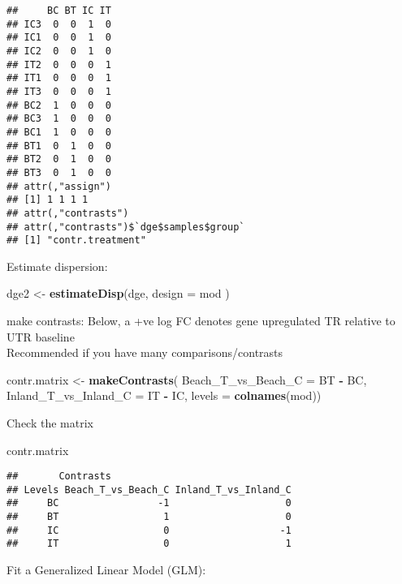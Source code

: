 \documentclass[
]{article}
\newenvironment{Shaded}{\begin{snugshade}}{\end{snugshade}}
\newcommand{\DataTypeTok}[1]{\textcolor[rgb]{0.13,0.29,0.53}{#1}}
\newcommand{\KeywordTok}[1]{\textcolor[rgb]{0.13,0.29,0.53}{\textbf{#1}}}
\newcommand{\NormalTok}[1]{#1}
\newcommand{\OperatorTok}[1]{\textcolor[rgb]{0.81,0.36,0.00}{\textbf{#1}}}
\newcommand{\StringTok}[1]{\textcolor[rgb]{0.31,0.60,0.02}{#1}}
\begin{document}
\begin{verbatim}
##     BC BT IC IT
## IC3  0  0  1  0
## IC1  0  0  1  0
## IC2  0  0  1  0
## IT2  0  0  0  1
## IT1  0  0  0  1
## IT3  0  0  0  1
## BC2  1  0  0  0
## BC3  1  0  0  0
## BC1  1  0  0  0
## BT1  0  1  0  0
## BT2  0  1  0  0
## BT3  0  1  0  0
## attr(,"assign")
## [1] 1 1 1 1
## attr(,"contrasts")
## attr(,"contrasts")$`dge$samples$group`
## [1] "contr.treatment"
\end{verbatim}

Estimate dispersion:

\begin{Shaded}
\begin{Highlighting}[]
\NormalTok{dge2 <-}\StringTok{ }\KeywordTok{estimateDisp}\NormalTok{(dge, }\DataTypeTok{design =}\NormalTok{ mod )}
\end{Highlighting}
\end{Shaded}

make contrasts: Below, a +ve log FC denotes gene upregulated TR relative
to UTR baseline\\
Recommended if you have many comparisons/contrasts

\begin{Shaded}
\begin{Highlighting}[]
\NormalTok{contr.matrix <-}\StringTok{ }\KeywordTok{makeContrasts}\NormalTok{(}
    \DataTypeTok{Beach_T_vs_Beach_C =}\NormalTok{ BT }\OperatorTok{-}\StringTok{ }\NormalTok{BC,}
    \DataTypeTok{Inland_T_vs_Inland_C =}\NormalTok{ IT }\OperatorTok{-}\StringTok{ }\NormalTok{IC,}
    \DataTypeTok{levels =} \KeywordTok{colnames}\NormalTok{(mod))}
\end{Highlighting}
\end{Shaded}

Check the matrix

\begin{Shaded}
\begin{Highlighting}[]
\NormalTok{contr.matrix}
\end{Highlighting}
\end{Shaded}

\begin{verbatim}
##       Contrasts
## Levels Beach_T_vs_Beach_C Inland_T_vs_Inland_C
##     BC                 -1                    0
##     BT                  1                    0
##     IC                  0                   -1
##     IT                  0                    1
\end{verbatim}

Fit a Generalized Linear Model (GLM):
\end{document}

